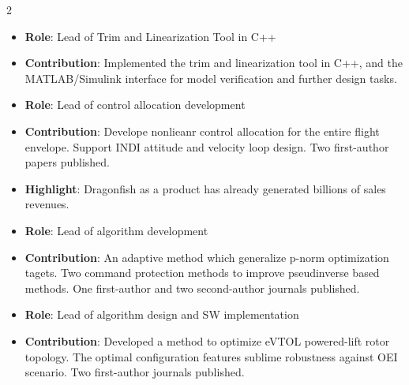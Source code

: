 \documentclass[10pt,a4paper,ragged2e,withhyper]{altacv}
\begin{document}
\begin{paracol}{2}
            \begin{itemize} \justifying
                \item \textbf{Role}: Lead of Trim and Linearization Tool in C++
                \item \textbf{Contribution}: Implemented the trim and linearization tool in C++, and the MATLAB/Simulink interface for model verification and further design tasks.
            \end{itemize}
            \bigskip

            \begin{itemize} \justifying
                \item \textbf{Role}: Lead of control allocation development
                \item \textbf{Contribution}: Develope nonlieanr control allocation for the entire flight envelope. Support INDI attitude and velocity loop design. Two first-author papers published.
                \item \textbf{Highlight}: Dragonfish as a product has already generated billions of sales revenues. 
            \end{itemize}
            
        
            \begin{itemize} \justifying
                \item \textbf{Role}: Lead of algorithm development
                \item \textbf{Contribution}: An adaptive method which generalize p-norm optimization tagets. Two command protection methods to improve pseudinverse based methods. One first-author and two second-author journals published.
            \end{itemize}
            \bigskip

            \begin{itemize} \justifying
                \item \textbf{Role}: Lead of algorithm design and SW implementation
                \item \textbf{Contribution}: Developed a method to optimize eVTOL powered-lift rotor topology. The optimal configuration features sublime robustness against OEI scenario. Two first-author journals published. 
            \end{itemize}
            \bigskip


\end{paracol}
\end{document}
